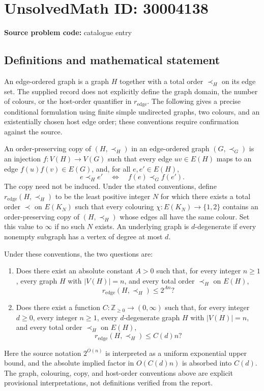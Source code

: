 \documentclass[11pt]{article}
\newcommand{\Z}{\mathbb{Z}}
\begin{document}
\section*{UnsolvedMath ID: 30004138}
\textbf{Source problem code:} catalogue entry
\subsection{Definitions and mathematical statement}
An edge-ordered graph is a graph \(H\) together with a total order \(\prec_H\) on its edge set. The supplied record does not explicitly define the graph domain, the number of colours, or the host-order quantifier in \(r_{\mathrm{edge}}\). The following gives a precise conditional formulation using finite simple undirected graphs, two colours, and an existentially chosen host edge order; these conventions require confirmation against the source.

An order-preserving copy of \((H,\prec_H)\) in an edge-ordered graph \((G,\prec_G)\) is an injection \(f:V(H)\to V(G)\) such that every edge \(uv\in E(H)\) maps to an edge \(f(u)f(v)\in E(G)\), and, for all \(e,e'\in E(H)\),
\[
e\prec_H e'\quad\Longleftrightarrow\quad f(e)\prec_G f(e').
\]
The copy need not be induced. Under the stated conventions, define \(r_{\mathrm{edge}}(H,\prec_H)\) to be the least positive integer \(N\) for which there exists a total order \(\prec\) on \(E(K_N)\) such that every colouring \(\chi:E(K_N)\to\{1,2\}\) contains an order-preserving copy of \((H,\prec_H)\) whose edges all have the same colour. Set this value to \(\infty\) if no such \(N\) exists. An underlying graph is \(d\)-degenerate if every nonempty subgraph has a vertex of degree at most \(d\).

Under these conventions, the two questions are:
\begin{enumerate}
\item Does there exist an absolute constant \(A>0\) such that, for every integer \(n\geq1\), every graph \(H\) with \(|V(H)|=n\), and every total order \(\prec_H\) on \(E(H)\),
\[
r_{\mathrm{edge}}(H,\prec_H)\leq 2^{An}?
\]
\item Does there exist a function \(C:\Z_{\geq0}\to(0,\infty)\) such that, for every integer \(d\geq0\), every integer \(n\geq1\), every \(d\)-degenerate graph \(H\) with \(|V(H)|=n\), and every total order \(\prec_H\) on \(E(H)\),
\[
r_{\mathrm{edge}}(H,\prec_H)\leq C(d)n?
\]
\end{enumerate}
Here the source notation \(2^{O(n)}\) is interpreted as a uniform exponential upper bound, and the absolute implied factor in \(O(C(d)n)\) is absorbed into \(C(d)\). The graph, colouring, copy, and host-order conventions above are explicit provisional interpretations, not definitions verified from the report.
\end{document}

